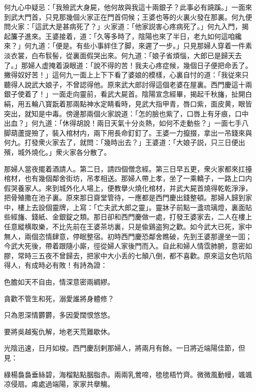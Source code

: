 何九心中疑忌：「我殮武大身屍，他何故與我這十兩銀子？此事必有蹺蹊。」一面來到武大門首，只見那幾個火家正在門首伺候；王婆也等的火裏火發在那裏。何九便問火家：「這武大是甚病死了？」火家道：「他家説害心疼病死了。」何九入門，揭起簾子進來。王婆接着，道：「久等多時了，陰陽也來了半日，老九如何這咱纔來？」何九道：「便是。有些小事絆住了脚，來遲了一步。」只見那婦人穿着一件素淡衣裳，白布䯼髻，從裏面假哭出來。何九道：「娘子省煩惱，大郎已是歸天去了。」那婦人虚掩着淚眼道：「說不得的苦！我夫心疼症候，幾個日子便把命丢了。撇得奴好苦！」這何九一面上上下下看了婆娘的模樣，心裏自忖的道：「我従來只聽得人說武大娘子，不曾認得他。原來武大郎討得這個老婆在屋裏。西門慶這十兩銀子使着了！」一面走向靈前，看武大屍首。陰陽宣念經畢，揭起千秋旛，扯開白絹，用五輪八寳翫着那兩點神水定睛看時，見武大指甲青，唇口紫，面皮黄，眼皆突出，就知是中毒。傍邊那兩個火家說道：「怎的臉也紫了，口唇上有牙痕，口中出血？」何九道：「休得胡說！兩日天氣十分炎熱，如何不走動些？」一面七手八脚葫蘆提殮了，裝入棺材内，兩下用長命釘釘了。王婆一力攛掇，拿出一吊錢來與何九。打發衆火家去了，就問：「幾時出去？」王婆道：「大娘子説，只三日便出殯，城外燒化。」衆火家各分散了。

那婦人當夜擺着酒請人。第二日，請四個僧念經。第三日早五更，衆火家都來扛擡棺材，也有幾個鄰舍街坊，吊孝相送。那婦人帶上孝，坐了一乘轎子，一路上口内假哭養家人。來到城外化人場上，便教擧火燒化棺材，并武大屍首燒得乾乾淨淨，把骨殖撒在池子裏。原來那日齋堂管待，一應都是西門慶出錢整頓。那婦人歸到家中，樓上去設個靈牌，上寫：「亡夫武大郎之靈」。靈牀子前點一盞琉璃燈，裏面貼些經旛、錢紙、金銀錠之類。那日卻和西門慶做一處，打發王婆家去，二人在樓上任意縱横取樂，不比先前在王婆茶坊裏，只是偸鷄盗狗之歡。如今武大已死，家中無人，兩個恣情肆意，停眠整宿。初時西門慶恐鄰舍瞧破，先到王婆那邊坐一囬；今武大死後，帶着跟隨小廝，徑從婦人家後門而入。自此和婦人情霑肺腑，意密如膠，常時三五夜不曾歸去，把家中大小丢的七顛八倒，都不喜歡。原來這女色坑陷得人，有成時必有敗！有詩為證：

\begin{myquote}
色膽如天不自由，情深意密兩綢繆。

貪歡不管生和死，溺愛誰將身體修？

只為恩深情欝欝，多因愛闊恨悠悠。

要將吳越寃仇解，地老天荒難歇休。
\end{myquote}

光陰迅速，日月如梭。西門慶刮剌那婦人，將兩月有餘。一日將近端陽佳節，但見：
\begin{myquote}
綠楊裊裊垂絲碧，海榴點點胭脂赤。兩兩乳鶯啼，毶毶梧竹齊。微微風動幔，颯颯凉侵扇。䖏處過端陽，家家共擧觴。
\end{myquote}

